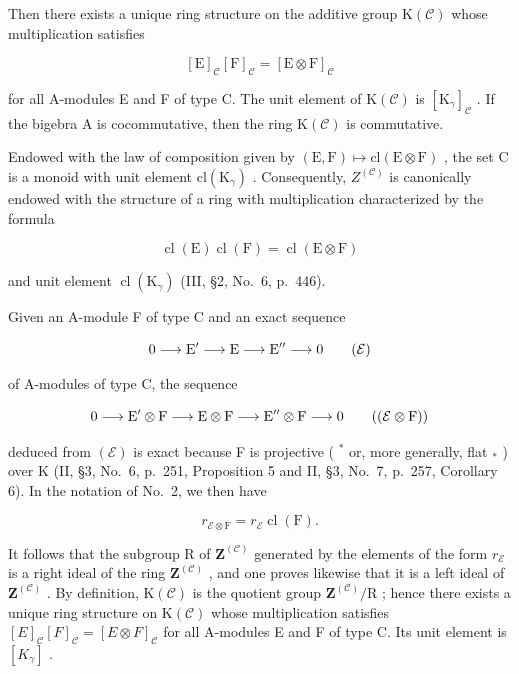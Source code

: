 Then there exists a unique ring structure on the additive group \(\mathrm{K}(\mathcal{C})\) whose multiplication satisfies

\[
[ \mathrm{E} ] _ {\mathcal {C}} [ \mathrm{F} ] _ {\mathcal {C}} = [ \mathrm{E} \otimes \mathrm{F} ] _ {\mathcal {C}}
\]

for all A-modules E and F of type C. The unit element of \(\mathrm{K}(\mathcal{C})\) is \([\mathrm{K}_{\gamma}]_{\mathcal{C}}\) . If the bigebra A is cocommutative, then the ring \(\mathrm{K}(\mathcal{C})\) is commutative.

Endowed with the law of composition given by \((\mathrm{E},\mathrm{F})\mapsto\mathrm{cl}(\mathrm{E}\otimes\mathrm{F})\) , the set C is a monoid with unit element \(\mathrm{cl}(\mathrm{K}_{\gamma})\) . Consequently, \(Z^{(\mathcal{C})}\) is canonically endowed with the structure of a ring with multiplication characterized by the formula

\[
\operatorname{cl} (\mathrm{E}) \operatorname{cl} (\mathrm{F}) = \operatorname{cl} (\mathrm{E} \otimes \mathrm{F})\tag{13}
\]

and unit element \(\operatorname{cl}(\mathrm{K}_{\gamma})\) (III, §2, No.~6, p.~446).

Given an A-module F of type C and an exact sequence

\[
0 \longrightarrow \mathrm{E} ^ {\prime} \longrightarrow \mathrm{E} \longrightarrow \mathrm{E} ^ {\prime \prime} \longrightarrow 0\tag{\( \mathcal{E} \)}
\]

of A-modules of type C, the sequence

\[
0 \longrightarrow \mathrm{E} ^ {\prime} \otimes \mathrm{F} \longrightarrow \mathrm{E} \otimes \mathrm{F} \longrightarrow \mathrm{E} ^ {\prime \prime} \otimes \mathrm{F} \longrightarrow 0\tag{\(\left(\mathcal{E}\otimes \mathrm{F}\right)\)}
\]

deduced from \((\mathcal{E})\) is exact because F is projective ( \(^{*}\) or, more generally, flat \(_{*}\) ) over K (II, §3, No.~6, p.~251, Proposition 5 and II, §3, No.~7, p.~257, Corollary 6). In the notation of No.~2, we then have

\[
r _ {\mathcal {E} \otimes \mathrm{F}} = r _ {\mathcal {E}} \operatorname{cl} (\mathrm{F}).\tag{14}
\]

It follows that the subgroup R of \(\mathbf{Z}^{(\mathcal{C})}\) generated by the elements of the form \(r_{\mathcal{E}}\) is a right ideal of the ring \(\mathbf{Z}^{(\mathcal{C})}\) , and one proves likewise that it is a left ideal of \(\mathbf{Z}^{(\mathcal{C})}\) . By definition, \(\mathrm{K}(\mathcal{C})\) is the quotient group \(\mathbf{Z}^{(\mathcal{C})}/\mathrm{R}\) ; hence there exists a unique ring structure on \(\mathrm{K}(\mathcal{C})\) whose multiplication satisfies \([E]_{\mathcal{C}}[F]_{\mathcal{C}} = [E \otimes F]_{\mathcal{C}}\) for all A-modules E and F of type C. Its unit element is \([K_{\gamma}]\) .

